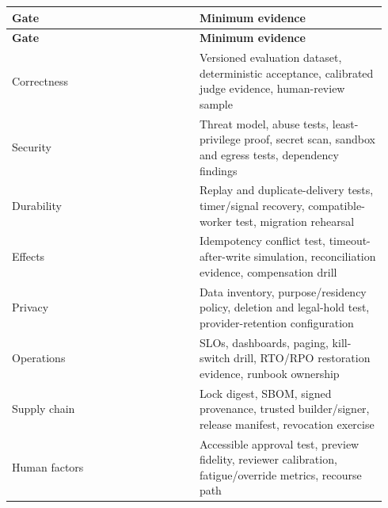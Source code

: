 \BookTableStart
\small
\begin{longtable}{@{}Y{0.4700\linewidth}Y{0.4700\linewidth}@{}}
\color{white}\bfseries \textbf{Gate} & \color{white}\bfseries \textbf{Minimum evidence} \\
\endfirsthead
{}
\color{white}\bfseries \textbf{Gate} & \color{white}\bfseries \textbf{Minimum evidence} \\
\endhead
Correctness & Versioned evaluation dataset, deterministic acceptance, calibrated judge evidence, human-review sample \\
Security & Threat model, abuse tests, least-privilege proof, secret scan, sandbox and egress tests, dependency findings \\
Durability & Replay and duplicate-delivery tests, timer/signal recovery, compatible-worker test, migration rehearsal \\
Effects & Idempotency conflict test, timeout-after-write simulation, reconciliation evidence, compensation drill \\
Privacy & Data inventory, purpose/residency policy, deletion and legal-hold test, provider-retention configuration \\
Operations & SLOs, dashboards, paging, kill-switch drill, RTO/RPO restoration evidence, runbook ownership \\
Supply chain & Lock digest, SBOM, signed provenance, trusted builder/signer, release manifest, revocation exercise \\
Human factors & Accessible approval test, preview fidelity, reviewer calibration, fatigue/override metrics, recourse path \\
\end{longtable}
\BookTableEnd
